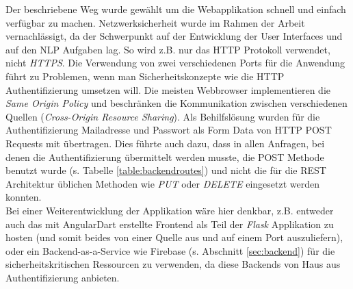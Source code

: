 Der beschriebene Weg wurde gewählt um die Webapplikation schnell und einfach verfügbar zu machen. Netzwerksicherheit wurde im Rahmen der Arbeit vernachlässigt, da der Schwerpunkt auf der Entwicklung der User Interfaces und auf den NLP Aufgaben lag. So wird z.B. nur das HTTP Protokoll verwendet, nicht \textit{HTTPS}. Die Verwendung von zwei verschiedenen Ports für die Anwendung führt zu Problemen, wenn man Sicherheitskonzepte wie die HTTP Authentifizierung umsetzen will. Die meisten Webbrowser implementieren die \textit{Same Origin Policy} und beschränken die Kommunikation zwischen verschiedenen Quellen (\textit{Cross-Origin Resource Sharing}\cite{kesteren2010}). Als Behilfslösung wurden für die Authentifizierung Mailadresse und Passwort als Form Data von HTTP POST Requests mit übertragen. Dies führte auch dazu, dass in allen Anfragen, bei denen die Authentifizierung übermittelt werden musste, die POST Methode benutzt wurde (s. Tabelle \ref{table:backendroutes}) und nicht die für die REST Architektur üblichen Methoden wie \textit{PUT} oder \textit{DELETE} eingesetzt werden konnten.\\
Bei einer Weiterentwicklung der Applikation wäre hier denkbar, z.B. entweder auch das mit AngularDart erstellte Frontend als Teil der \textit{Flask} Applikation zu hosten (und somit beides von einer Quelle aus und auf einem Port auszuliefern), oder ein Backend-as-a-Service wie Firebase (s. Abschnitt \ref{sec:backend}) für die sicherheitskritischen Ressourcen zu verwenden, da diese Backends von Haus aus Authentifizierung anbieten.